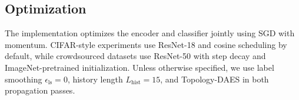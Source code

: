 \subsection{Optimization}
The implementation optimizes the encoder and classifier jointly using SGD with
momentum. CIFAR-style experiments use ResNet-18 and cosine scheduling by
default, while crowdsourced datasets use ResNet-50 with step decay and
ImageNet-pretrained initialization. Unless otherwise specified, we use label
smoothing $\epsilon_{\mathrm{ls}}=0$, history length $L_{\mathrm{hist}}=15$, and
Topology-DAES in both propagation passes.

